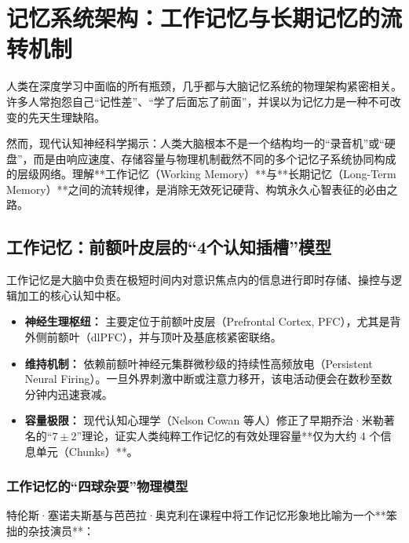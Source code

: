 \documentclass[12pt,a4paper,openany]{ctexbook}
\begin{document}
\chapter{记忆系统架构：工作记忆与长期记忆的流转机制}

人类在深度学习中面临的所有瓶颈，几乎都与大脑记忆系统的物理架构紧密相关。许多人常抱怨自己“记性差”、“学了后面忘了前面”，并误以为记忆力是一种不可改变的先天生理缺陷。

然而，现代认知神经科学揭示：人类大脑根本不是一个结构均一的“录音机”或“硬盘”，而是由响应速度、存储容量与物理机制截然不同的多个记忆子系统协同构成的层级网络。理解**工作记忆（Working Memory）**与**长期记忆（Long-Term Memory）**之间的流转规律，是消除无效死记硬背、构筑永久心智表征的必由之路。

\section{工作记忆：前额叶皮层的“4个认知插槽”模型}

工作记忆是大脑中负责在极短时间内对意识焦点内的信息进行即时存储、操控与逻辑加工的核心认知中枢。

\begin{keypoint}[工作记忆的核心参数]
\begin{itemize}
    \item \textbf{神经生理枢纽：} 主要定位于前额叶皮层（Prefrontal Cortex, PFC），尤其是背外侧前额叶（dlPFC），并与顶叶及基底核紧密联络。
    \item \textbf{维持机制：} 依赖前额叶神经元集群微秒级的持续性高频放电（Persistent Neural Firing）。一旦外界刺激中断或注意力移开，该电活动便会在数秒至数分钟内迅速衰减。
    \item \textbf{容量极限：} 现代认知心理学（Nelson Cowan 等人）修正了早期乔治·米勒著名的“$7 \pm 2$”理论，证实人类纯粹工作记忆的有效处理容量**仅为大约 4 个信息单元（Chunks）**。
\end{itemize}
\end{keypoint}

\subsection*{工作记忆的“四球杂耍”物理模型}

特伦斯·塞诺夫斯基与芭芭拉·奥克利在课程中将工作记忆形象地比喻为一个**笨拙的杂技演员**：
\end{document}

